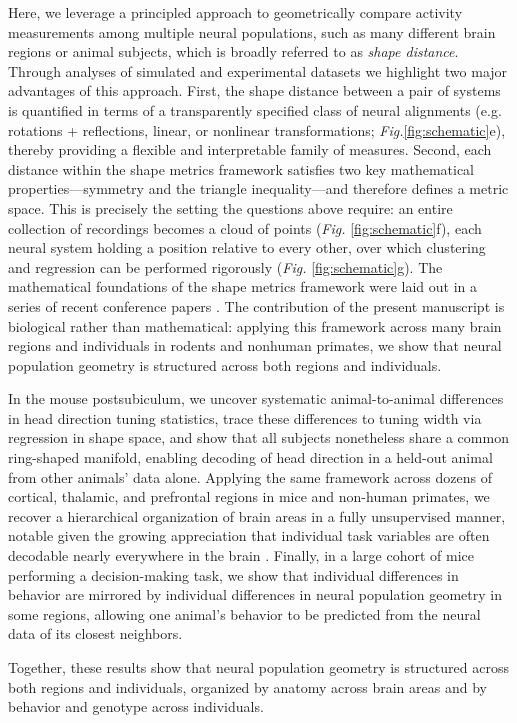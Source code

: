 Here, we leverage a principled approach to geometrically compare activity measurements among multiple neural populations, such as many different brain regions or animal subjects, which is broadly referred to as \emph{shape distance}. 
Through analyses of simulated and experimental datasets we highlight two major advantages of this approach.
First, the shape distance between a pair of systems is quantified in terms of a transparently specified class of neural alignments (e.g. rotations + reflections, linear, or nonlinear transformations; \textit{Fig.}\ref{fig:schematic}e), thereby providing a flexible and interpretable family of measures.
Second, each distance within the shape metrics framework satisfies two key mathematical properties---symmetry and the triangle inequality---and therefore defines a metric space. This is precisely the setting the questions above require: an entire collection of recordings becomes a cloud of points (\textit{Fig.} \ref{fig:schematic}f), each neural system holding a position relative to every other, over which clustering and regression can be performed rigorously (\textit{Fig.}  \ref{fig:schematic}g). The mathematical foundations of the shape metrics framework were laid out in a series of recent conference papers \parencite{Williams2021,pospisil2023estimating,harvey2024duality,khosla2024soft}.
The contribution of the present manuscript is biological rather than mathematical: applying this framework across many brain regions and individuals in rodents and nonhuman primates, we show that neural population geometry is structured across both regions and individuals.

In the mouse postsubiculum, we uncover systematic animal-to-animal differences in head direction tuning statistics, trace these differences to tuning width via regression in shape space, and show that all subjects nonetheless share a common ring-shaped manifold, enabling decoding of head direction in a held-out animal from other animals' data alone. Applying the same framework across dozens of cortical, thalamic, and prefrontal regions in mice and non-human primates, we recover a hierarchical organization of brain areas in a fully unsupervised manner, notable given the growing appreciation that individual task variables are often decodable nearly everywhere in the brain \parencite{findling2025brain,angelaki2025brain, Lloreda2025,rosen2026distributed}. Finally, in a large cohort of mice performing a decision-making task, we show that individual differences in behavior are mirrored by individual differences in neural population geometry in some regions, allowing one animal's behavior to be predicted from the neural data of its closest neighbors. 

Together, these results show that neural population geometry is structured across both regions and individuals, organized by anatomy across brain areas and by behavior and genotype across individuals.